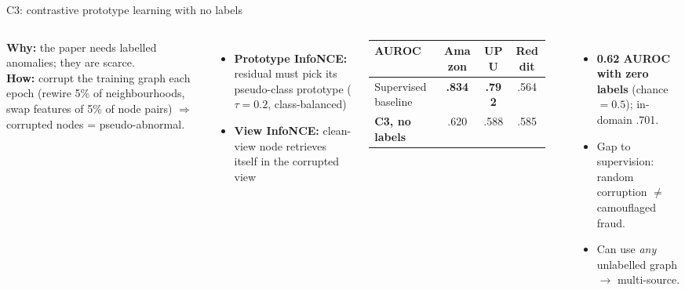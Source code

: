 \documentclass[aspectratio=169,11pt]{beamer}
\begin{document}
\begin{frame}{C3: contrastive prototype learning with \alert{no labels}}
\begin{columns}[T]
\textbf{Why:} the paper needs labelled anomalies; they are scarce.\\[4pt]
\textbf{How:} corrupt the training graph each epoch (rewire 5\% of neighbourhoods, swap features of 5\% of node pairs) $\Rightarrow$ corrupted nodes = pseudo-abnormal.
\begin{itemize}\footnotesize
\item \textbf{Prototype InfoNCE:} residual must pick its pseudo-class prototype ($\tau{=}0.2$, class-balanced)
\item \textbf{View InfoNCE:} clean-view node retrieves itself in the corrupted view
\end{itemize}
\small
\begin{tabular}{lccc}
\toprule
AUROC & Amazon & UPU & Reddit\\ \midrule
Supervised baseline & \textbf{.834} & \textbf{.792} & .564\\
\textbf{C3, no labels} & .620 & .588 & .585\\ \bottomrule
\end{tabular}\\[4pt]
\begin{itemize}\footnotesize
\item \textcolor{good}{\textbf{0.62 AUROC with zero labels}} (chance $=0.5$); in-domain .701.
\item Gap to supervision: random corruption $\ne$ camouflaged fraud.
\item Can use \emph{any} unlabelled graph $\to$ multi-source.
\end{itemize}
\end{columns}
\end{frame}
\end{document}
